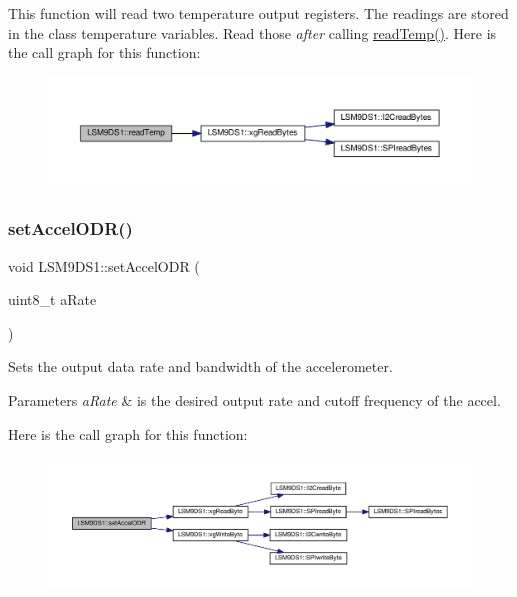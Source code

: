 This function will read two temperature output registers. The readings are stored in the class\textquotesingle{} temperature variables. Read those {\itshape after} calling \hyperlink{classLSM9DS1_aca21a51dc79a1287b97ed9c326e2080b}{read\+Temp()}. Here is the call graph for this function\+:\nopagebreak
\begin{figure}[H]
\begin{center}
\leavevmode
\includegraphics[width=350pt]{classLSM9DS1_aca21a51dc79a1287b97ed9c326e2080b_cgraph}
\end{center}
\end{figure}
\mbox{\label{classLSM9DS1_a76d72839cdecc3f1c4ee6fff578182c5}} 
\subsubsection{\texorpdfstring{set\+Accel\+O\+D\+R()}{setAccelODR()}}
{\footnotesize\ttfamily void L\+S\+M9\+D\+S1\+::set\+Accel\+O\+DR (\begin{DoxyParamCaption}\item[{uint8\+\_\+t}]{a\+Rate }\end{DoxyParamCaption})}



Sets the output data rate and bandwidth of the accelerometer. 


\begin{DoxyParams}{Parameters}
{\em a\+Rate} & is the desired output rate and cutoff frequency of the accel. \\
\hline
\end{DoxyParams}
Here is the call graph for this function\+:\nopagebreak
\begin{figure}[H]
\begin{center}
\leavevmode
\includegraphics[width=350pt]{classLSM9DS1_a76d72839cdecc3f1c4ee6fff578182c5_cgraph}
\end{center}
\end{figure}
\mbox{\label{classLSM9DS1_a8656d2de1ff9cc4cb76214e4561d02c4}} 
